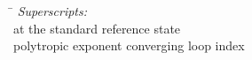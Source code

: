 \begin{tabbing}\hspace*{\lensymb}\=\hspace*{\lenWHAT}\kill
    {\em Superscripts:} \\                                                                       
                                      \> at the standard reference state                                                                                          \\
                                      \> polytropic exponent converging loop index                                                                                                \\
\end{tabbing}


